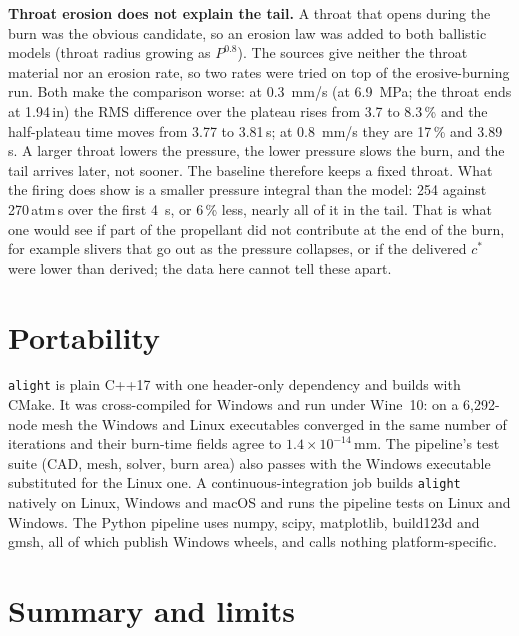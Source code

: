 \documentclass[10pt,a4paper]{article}
\begin{document}
\textbf{Throat erosion does not explain the tail.} A throat that opens during the burn was the obvious candidate, so an erosion law was added to both ballistic models (throat radius growing as $P^{0.8}$). The sources give neither the throat material nor an erosion rate, so two rates were tried on top of the erosive-burning run. Both make the comparison worse: at \SI{0.3}{mm/s} (at \SI{6.9}{MPa}; the throat ends at 1.94\,in) the RMS difference over the plateau rises from 3.7 to 8.3\,\% and the half-plateau time moves from 3.77 to 3.81\,s; at \SI{0.8}{mm/s} they are 17\,\% and 3.89\,s. A larger throat lowers the pressure, the lower pressure slows the burn, and the tail arrives later, not sooner. The baseline therefore keeps a fixed throat. What the firing does show is a smaller pressure integral than the model: 254 against 270\,atm\,s over the first \SI{4}{s}, or 6\,\% less, nearly all of it in the tail. That is what one would see if part of the propellant did not contribute at the end of the burn, for example slivers that go out as the pressure collapses, or if the delivered $c^*$ were lower than derived; the data here cannot tell these apart.

\section{Portability}

\texttt{alight} is plain C++17 with one header-only dependency and builds with CMake. It was
cross-compiled for Windows and run under Wine~10: on a 6,292-node mesh the Windows and Linux
executables converged in the same number of iterations and their burn-time fields agree to
$1.4\times10^{-14}$\,mm. The pipeline's test suite (CAD, mesh, solver, burn area) also passes with the Windows executable substituted for the Linux one. A continuous-integration job builds \texttt{alight} natively on Linux, Windows and macOS and runs the pipeline tests on Linux and Windows. The Python pipeline uses numpy, scipy, matplotlib,
build123d and gmsh, all of which publish Windows wheels, and calls nothing platform-specific.

\section{Summary and limits}
\end{document}
